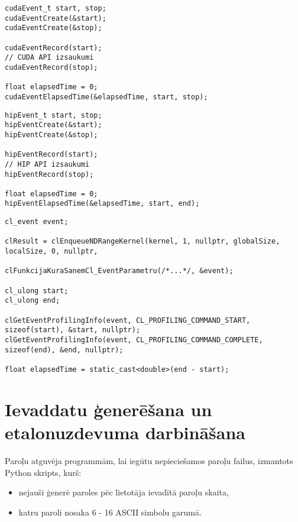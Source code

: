 \begin{lstlisting}[caption={CUDA laika mērīšanas piemērs},
    captionpos=b,
    label=lst:cuda_example]
cudaEvent_t start, stop;
cudaEventCreate(&start);
cudaEventCreate(&stop);

cudaEventRecord(start);
// CUDA API izsaukumi
cudaEventRecord(stop);

float elapsedTime = 0;
cudaEventElapsedTime(&elapsedTime, start, stop);
\end{lstlisting}

\begin{lstlisting}[caption={ROCm HIP laika mērīšanas piemērs},
    captionpos=b,
    label=lst:hip_example]
hipEvent_t start, stop;
hipEventCreate(&start);
hipEventCreate(&stop);

hipEventRecord(start);
// HIP API izsaukumi
hipEventRecord(stop);

float elapsedTime = 0;
hipEventElapsedTime(&elapsedTime, start, end);
\end{lstlisting}

\begin{lstlisting}[caption={OpenCL laika mērīšanas piemērs},
    captionpos=b,
    label=lst:cl_example]
cl_event event;

clResult = clEnqueueNDRangeKernel(kernel, 1, nullptr, globalSize, localSize, 0, nullptr,

clFunkcijaKuraSanemCl_EventParametru(/*...*/, &event);

cl_ulong start;
cl_ulong end;

clGetEventProfilingInfo(event, CL_PROFILING_COMMAND_START, sizeof(start), &start, nullptr);
clGetEventProfilingInfo(event, CL_PROFILING_COMMAND_COMPLETE, sizeof(end), &end, nullptr);

float elapsedTime = static_cast<double>(end - start);
\end{lstlisting}

\section{Ievaddatu ģenerēšana un etalonuzdevuma darbināšana}
Paroļu atguvēja programmām, lai iegūtu nepieciešamos paroļu failus, izmantots
Python skripts\cite{kursa-darbs}, kurš: 
\begin{itemize}
    \item nejauši ģenerē paroles pēc lietotāja ievadītā paroļu skaita,
    \item katru paroli nosaka 6 - 16 ASCII simbolu garumā.
\end{itemize}

